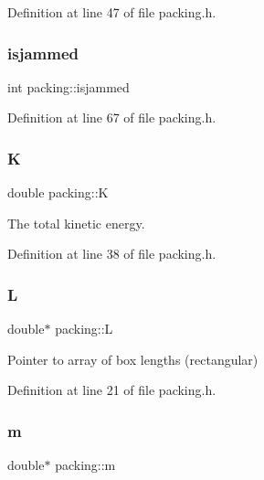 Definition at line 47 of file packing.\+h.

\mbox{\label{classpacking_a8a79180aa5d7bd8faa6d048f036f5d2b}} 
\subsubsection{\texorpdfstring{isjammed}{isjammed}}
{\footnotesize\ttfamily int packing\+::isjammed\hspace{0.3cm}{\ttfamily [protected]}}



Definition at line 67 of file packing.\+h.

\mbox{\label{classpacking_acf38ce991d03baddda7344ec7e979f6c}} 
\subsubsection{\texorpdfstring{K}{K}}
{\footnotesize\ttfamily double packing\+::K\hspace{0.3cm}{\ttfamily [protected]}}



The total kinetic energy. 



Definition at line 38 of file packing.\+h.

\mbox{\label{classpacking_ae4a6707ea8b2af01eda36ea9d230259e}} 
\subsubsection{\texorpdfstring{L}{L}}
{\footnotesize\ttfamily double$\ast$ packing\+::L\hspace{0.3cm}{\ttfamily [protected]}}



Pointer to array of box lengths (rectangular) 



Definition at line 21 of file packing.\+h.

\mbox{\label{classpacking_ab06bef3feef42f5c48c39fa1ae297e23}} 
\subsubsection{\texorpdfstring{m}{m}}
{\footnotesize\ttfamily double$\ast$ packing\+::m\hspace{0.3cm}{\ttfamily [protected]}}




